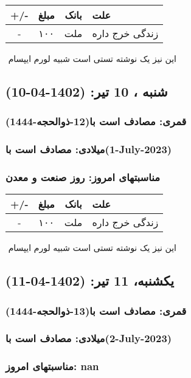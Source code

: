 \documentclass{article}
\newcommand{\rnote}[1]{\marginpar{\textcolor{color}{\StrSubstitute{\##1}{ }{\_}}}}
\newcommand{\myRow}[4]{
    #1 & #2 & #3 & #4 \\ \hline
}
\begin{document}
\begin{tabular}{ | c | c | c | p{5cm} |}
    \hline
    \myRow{ +/- }{مبلغ}{بانک}{علت}
    \myRow{-}{۱۰۰}{ملت}{زندگی خرج داره}
\end{tabular}
\newline
\newline

‌
\rnote{تست}
این نیز یک نوشته تستی است شبیه لورم ایپسام




\newpage
{}
\textcolor{color}{
\section{ شنبه ، 10 تیر: (1402-04-10) }
\subsubsection*{قمری: مصادف است با(12-ذوالحجه-1444)} 
\subsubsection*{میلادی: مصادف است با(1-July-2023)}
\subsubsection*{مناسبتهای امروز: روز صنعت و معدن}
}


\begin{tabular}{ | c | c | c | p{5cm} |}
    \hline
    \myRow{ +/- }{مبلغ}{بانک}{علت}
    \myRow{-}{۱۰۰}{ملت}{زندگی خرج داره}
\end{tabular}
\newline
\newline

‌
\rnote{تست}
این نیز یک نوشته تستی است شبیه لورم ایپسام




\newpage
{}
\textcolor{color}{
\section{ یکشنبه، 11 تیر: (1402-04-11) }
\subsubsection*{قمری: مصادف است با(13-ذوالحجه-1444)} 
\subsubsection*{میلادی: مصادف است با(2-July-2023)}
\subsubsection*{مناسبتهای امروز: nan}
}
\end{document}
